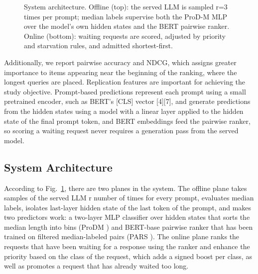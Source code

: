 \documentclass[conference]{IEEEtran}
\begin{document}
\begin{figure}[!t]
{
}
\caption{System architecture. Offline (top): the served LLM is sampled r=3 times per prompt; median labels supervise both the ProD-M MLP over the model's own hidden states and the BERT pairwise ranker. Online (bottom): waiting requests are scored, adjusted by priority and starvation rules, and admitted shortest-first.}
\label{fig:architecture}
\end{figure}

Additionally, we report pairwise accuracy and NDCG, which assigns greater
importance to items appearing near the beginning of the ranking, where the
longest queries are placed. Replication features are important for achieving
the study objective. Prompt-based predictions represent each prompt using a
small pretrained encoder, such as BERT's  [CLS] vector [4][7],
and generate predictions from the hidden states using a model with a linear
layer applied to the hidden state of the final prompt token, and BERT embeddings feed the pairwise ranker, so scoring a waiting request never requires a generation pass from the served model.

\subsection{System Architecture}
According to Fig.~\ref{fig:architecture}, there are two planes in the system. The offline plane takes samples of the served LLM r number of times for every prompt, evaluates median labels, isolates last-layer hidden state of the last token of the prompt, and makes two predictors work: a two-layer MLP classifier over hidden states that sorts the median length into bins (ProDM \cite{wang2026prodm}) and BERT-base \cite{devlin2019bert} pairwise ranker that has been trained on filtered median-labeled pairs (PARS \cite{tao2025pars}). The online plane ranks the requests that have been waiting for a response using the ranker and enhance the priority based on the class of the request, which adds a signed boost per class, as well as promotes a request that has already waited too long.
\end{document}
